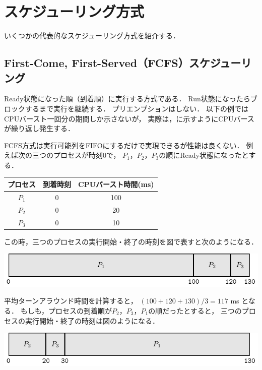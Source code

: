 \section{スケジューリング方式}
いくつかの代表的なスケジューリング方式を紹介する．

\subsection{First-Come, First-Served（FCFS）スケジューリング}
Ready状態になった順（到着順）に実行する方式である．
Run状態になったらブロックするまで実行を継続する．
プリエンプションはしない．
以下の例ではCPUバースト一回分の期間しか示さないが，
実際は，に示すようにCPUバースが繰り返し発生する．

FCFS方式は実行可能列をFIFOにするだけで実現できるが性能は良くない．
例えば次の三つのプロセスが時刻0で，
$P_1$，$P_2$，$P_3$の順にReady状態になったとする．

\begin{center}
\begin{tabular}{c c c}
プロセス & 到着時刻 & CPUバースト時間(ms) \\
\hline
$P_1$    & 0 & 100 \\
$P_2$    & 0 & 20 \\
$P_3$    & 0 & 10 \\
\end{tabular}
\end{center}

この時，三つのプロセスの実行開始・終了の時刻を図で表すと次のようになる．

\begin{center}
\includegraphics[scale=1.0]{Tbl/fcfs1.pdf}
\end{center}

平均ターンアラウンド時間を計算すると，
$(100+120+130) / 3 = 117$ ms となる．
もしも，プロセスの到着順が$P_2$，$P_3$，$P_1$の順だったとすると，
三つのプロセスの実行開始・終了の時刻は図のようになる．

\begin{center}
\includegraphics[scale=1.0]{Tbl/fcfs2.pdf}
\end{center}


